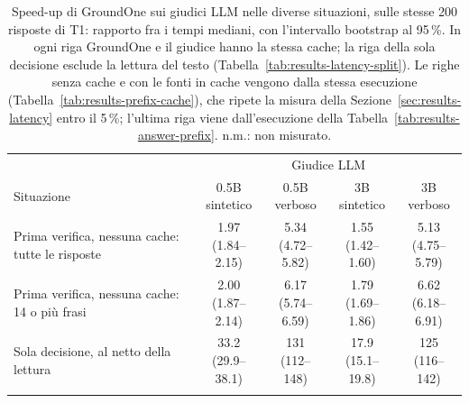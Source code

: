 \begin{table}[htbp]
\centering
\caption{Speed-up di GroundOne sui giudici LLM nelle diverse situazioni, sulle stesse 200 risposte di T1: rapporto fra i tempi mediani, con l'intervallo bootstrap al 95\,\%. In ogni riga GroundOne e il giudice hanno la stessa cache; la riga della sola decisione esclude la lettura del testo (Tabella~\ref{tab:results-latency-split}). Le righe senza cache e con le fonti in cache vengono dalla stessa esecuzione (Tabella~\ref{tab:results-prefix-cache}), che ripete la misura della Sezione~\ref{sec:results-latency} entro il 5\,\%; l'ultima riga viene dall'esecuzione della Tabella~\ref{tab:results-answer-prefix}. n.m.: non misurato.}
\label{tab:results-speedup-summary}
\small
\setlength{\tabcolsep}{3.5pt}
\begin{tabular}{>{\raggedright\arraybackslash}p{5.4cm}cccc}
\toprule
& \multicolumn{4}{c}{Giudice LLM} \\ \cmidrule(lr){2-5}
Situazione & \makecell{0.5B\\sintetico} & \makecell{0.5B\\verboso} & \makecell{3B\\sintetico} & \makecell{3B\\verboso} \\
\midrule
Prima verifica, nessuna cache: tutte le risposte & \makecell{1.97\\{\footnotesize (1.84--2.15)}} & \makecell{5.34\\{\footnotesize (4.72--5.82)}} & \makecell{1.55\\{\footnotesize (1.42--1.60)}} & \makecell{5.13\\{\footnotesize (4.75--5.79)}} \\ \addlinespace[2pt]
Prima verifica, nessuna cache: 14 o più frasi & \makecell{2.00\\{\footnotesize (1.87--2.14)}} & \makecell{6.17\\{\footnotesize (5.74--6.59)}} & \makecell{1.79\\{\footnotesize (1.69--1.86)}} & \makecell{6.62\\{\footnotesize (6.18--6.91)}} \\ \addlinespace[2pt]
Sola decisione, al netto della lettura & \makecell{33.2\\{\footnotesize (29.9--38.1)}} & \makecell{131\\{\footnotesize (112--148)}} & \makecell{17.9\\{\footnotesize (15.1--19.8)}} & \makecell{125\\{\footnotesize (116--142)}} \\ \addlinespace[2pt]

\end{tabular}
\end{table}
